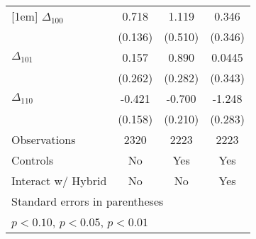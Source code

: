 {\begin{tabular}{l*{3}{c}}
[1em]
$\Delta_{100}$&       0.718\sym{***}&       1.119\sym{**} &       0.346         \\
            &     (0.136)         &     (0.510)         &     (0.346)         \\
[1em]
$\Delta_{101}$&       0.157         &       0.890\sym{***}&      0.0445         \\
            &     (0.262)         &     (0.282)         &     (0.343)         \\
[1em]
$\Delta_{110}$&      -0.421\sym{***}&      -0.700\sym{***}&      -1.248\sym{***}\\
            &     (0.158)         &     (0.210)         &     (0.283)         \\
\hline
Observations&        2320         &        2223         &        2223         \\
Controls    &          No         &         Yes         &         Yes         \\
Interact w/ Hybrid&          No         &          No         &         Yes         \\
\hline\hline
\multicolumn{4}{l}{\footnotesize Standard errors in parentheses}\\
\multicolumn{4}{l}{\footnotesize \sym{*} \(p<0.10\), \sym{**} \(p<0.05\), \sym{***} \(p<0.01\)}\\
\end{tabular}
}
